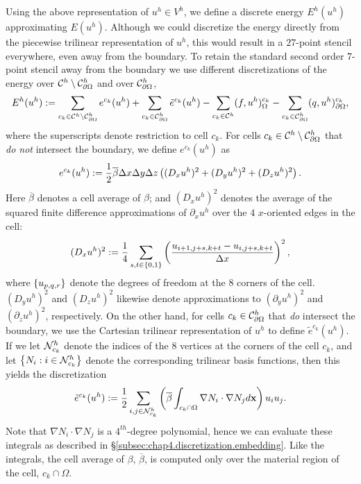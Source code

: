 Using the above representation of $u^h \in V^h$, we define a discrete energy $E^h(u^h)$ approximating $E(u^h)$. Although we could discretize the energy directly from the piecewise trilinear representation of $u^h$, this would result in a $27$-point stencil everywhere, even away from the boundary. To retain the standard second order $7$-point stencil away from the boundary we use different discretizations of the energy over $\mathcal{C}^h \setminus \mathcal{C}^h_{\partial\Omega}$ and over $\mathcal{C}^h_{\partial\Omega}$,
\begin{equation} \label{eq:chap4.neumann.energy.discrete}
E^h(u^h) := \sum_{c_k \in \mathcal{C}^h \setminus \mathcal{C}_{\partial\Omega}^h} e^{c_k}(u^h) + \sum_{c_k \in \mathcal{C}_{\partial\Omega}^h} \tilde{e}^{c_k}(u^h) - \sum_{c_k \in \mathcal{C}^h} (f, u^h)^{c_k}_{\Omega} - \sum_{c_k \in \mathcal{C}_{\partial\Omega}^h} (q, u^h)^{c_k}_{\partial\Omega},
\end{equation}
where the superscripts denote restriction to cell $c_k$. For cells $c_k \in \mathcal{C}^h \setminus \mathcal{C}^h_{\partial\Omega}$ that \emph{do not} intersect the boundary, we define $e^{c_k}(u^h)$ as
\begin{equation*}
e^{c_k}(u^h) := \frac{1}{2} \overline{\beta} \Delta x \Delta y \Delta z \left( (D_x u^h)^2 + (D_y u^h)^2 + (D_z u^h)^2 \right).
\end{equation*}
Here $\overline{\beta}$ denotes a cell average of $\beta$; and $(D_x u^h)^2$ denotes the average of the squared finite difference approximations of $\partial_x u^h$ over the $4$ $x$-oriented edges in the cell:
\begin{equation*}
(D_x u^h)^2 := \frac{1}{4} \sum_{s,t \in \left\lbrace 0,1 \right\rbrace} \left( \frac{u_{i+1,j+s,k+t} - u_{i,j+s,k+t}}{\Delta x} \right)^2,
\end{equation*}
where $\left\lbrace u_{p,q,r} \right\rbrace$ denote the degrees of freedom at the $8$ corners of the cell. $(D_y u^h)^2$ and $(D_z u^h)^2$ likewise denote approximations to $(\partial_y u^h)^2$ and $(\partial_z u^h)^2$, respectively. On the other hand, for cells $c_k \in \mathcal{C}^h_{\partial\Omega}$ that \emph{do} intersect the boundary, we use the Cartesian trilinear representation of $u^h$ to define $\tilde{e}^{c_k}(u^h)$. If we let $\mathcal{N}^h_{c_k}$ denote the indices of the $8$ vertices at the corners of the cell $c_k$, and let $\left\lbrace N_i : i \in \mathcal{N}^h_{c_k} \right\rbrace$ denote the corresponding trilinear basis functions, then this yields the discretization
\begin{equation} \label{eq:chap4.neumann.energy.boundary}
\tilde{e}^{c_k}(u^h) := \frac{1}{2} \sum_{i,j \in \mathcal{N}^h_{c_k}} \left( \overline{\beta} \int_{c_k \cap \Omega} \nabla N_i \cdot \nabla N_j d\mathbf{x} \right) u_i u_j.
\end{equation}
Note that $\nabla N_i \cdot \nabla N_j$ is a $4^{th}$-degree polynomial, hence we can evaluate these integrals as described in \S\ref{subsec:chap4.discretization.embedding}. Like the integrals, the cell average of $\beta$, $\overline{\beta}$, is computed only over the material region of the cell, $c_k \cap \Omega$.


